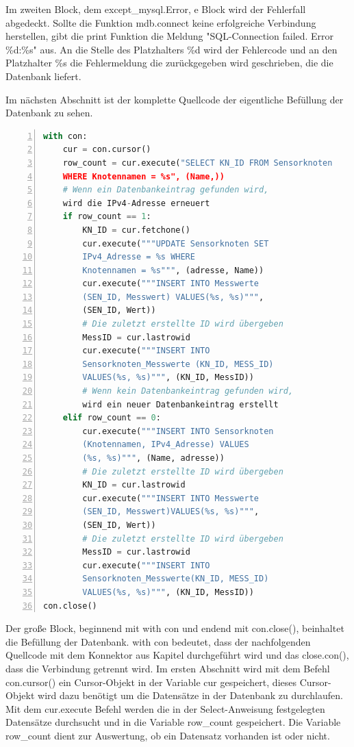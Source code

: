 \noindent Im zweiten Block, dem except\_mysql.Error, e Block wird der Fehlerfall abgedeckt. Sollte die Funktion mdb.connect keine erfolgreiche Verbindung herstellen, gibt die print Funktion die Meldung "SQL-Connection failed. Error \%d:\%s" aus. An die Stelle des Platzhalters \%d wird der Fehlercode und an den Platzhalter \%s die Fehlermeldung die zurückgegeben wird geschrieben, die die Datenbank liefert.

Im nächsten Abschnitt ist der komplette Quellcode der eigentliche Befüllung der Datenbank zu sehen.
\begin{lstlisting}[caption=Befüllen der Datenbank,frame=single,numbers=left,language=Python]
with con:
	cur = con.cursor()
	row_count = cur.execute("SELECT KN_ID FROM Sensorknoten
	WHERE Knotennamen = %s", (Name,))
	# Wenn ein Datenbankeintrag gefunden wird,
	wird die IPv4-Adresse erneuert
	if row_count == 1:
		KN_ID = cur.fetchone()
		cur.execute("""UPDATE Sensorknoten SET
		IPv4_Adresse = %s WHERE
		Knotennamen = %s""", (adresse, Name))
		cur.execute("""INSERT INTO Messwerte 
		(SEN_ID, Messwert) VALUES(%s, %s)""",
		(SEN_ID, Wert))
		# Die zuletzt erstellte ID wird übergeben
		MessID = cur.lastrowid
		cur.execute("""INSERT INTO 
		Sensorknoten_Messwerte (KN_ID, MESS_ID)
		VALUES(%s, %s)""", (KN_ID, MessID))
		# Wenn kein Datenbankeintrag gefunden wird,
		wird ein neuer Datenbankeintrag erstellt
	elif row_count == 0:
		cur.execute("""INSERT INTO Sensorknoten
		(Knotennamen, IPv4_Adresse) VALUES
		(%s, %s)""", (Name, adresse))
		# Die zuletzt erstellte ID wird übergeben
		KN_ID = cur.lastrowid
		cur.execute("""INSERT INTO Messwerte
		(SEN_ID, Messwert)VALUES(%s, %s)""",
		(SEN_ID, Wert))
		# Die zuletzt erstellte ID wird übergeben
		MessID = cur.lastrowid
		cur.execute("""INSERT INTO 
		Sensorknoten_Messwerte(KN_ID, MESS_ID)
		VALUES(%s, %s)""", (KN_ID, MessID))
con.close()
\end{lstlisting}
Der große Block, beginnend mit with con und endend mit con.close(), beinhaltet die Befüllung der Datenbank. with con bedeutet, dass der nachfolgenden Quellcode mit dem Konnektor aus Kapitel  durchgeführt wird und das close.con(), dass die Verbindung getrennt wird. Im ersten Abschnitt wird mit dem Befehl con.cursor() ein Cursor-Objekt in der Variable cur gespeichert, dieses Cursor-Objekt wird dazu benötigt um die Datensätze in der Datenbank zu durchlaufen. Mit dem cur.execute Befehl werden die in der Select-Anweisung festgelegten Datensätze durchsucht und in die Variable row\_count gespeichert. Die Variable row\_count dient zur Auswertung, ob ein Datensatz vorhanden ist oder nicht.\hfill
